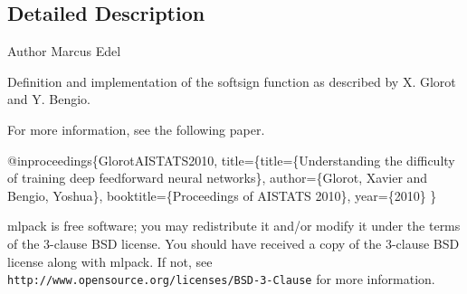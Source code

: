 \subsection{Detailed Description}
\begin{DoxyAuthor}{Author}
Marcus Edel
\end{DoxyAuthor}
Definition and implementation of the softsign function as described by X. Glorot and Y. Bengio.

For more information, see the following paper.


\begin{DoxyCode}
@inproceedings\{GlorotAISTATS2010,
  title=\{title=\{Understanding the difficulty of training deep feedforward
  neural networks\},
  author=\{Glorot, Xavier and Bengio, Yoshua\},
  booktitle=\{Proceedings of AISTATS 2010\},
  year=\{2010\}
\}
\end{DoxyCode}


mlpack is free software; you may redistribute it and/or modify it under the terms of the 3-\/clause B\+SD license. You should have received a copy of the 3-\/clause B\+SD license along with mlpack. If not, see {\tt http\+://www.\+opensource.\+org/licenses/\+B\+S\+D-\/3-\/\+Clause} for more information. 